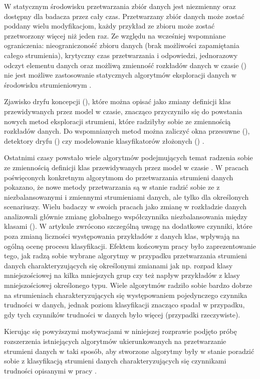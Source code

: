 W statycznym środowisku przetwarzania zbiór danych jest niezmienny oraz dostępny dla badacza przez cały czas. Przetwarzany zbiór danych może zostać poddany wielu modyfikacjom, każdy przykład ze zbioru może zostać przetworzony więcej niż jeden raz. Ze względu na wcześniej wspomniane ograniczenia: nieograniczoność zbioru danych (brak możliwości zapamiętania całego strumienia), krytyczny czas przetwarzania i odpowiedzi, jednorazowy odczyt elementu danych oraz możliwą zmienność rozkładów danych w czasie () nie jest możliwe zastosowanie statycznych algorytmów eksploracji danych w środowisku strumieniowym \cite{Article:TradDataStream}\cite{Prezentacja:Strumienie}.

Zjawisko dryfu koncepcji (), które można opisać jako zmiany definicji klas przewidywanych przez model w czasie, znacząco przyczyniło się do powstania nowych metod eksploracji strumieni, które radziłyby sobie ze zmiennością rozkładów danych. Do wspomnianych metod można zaliczyć okna przesuwne (), detektory dryfu () czy modelowanie klasyfikatorów złożonych () \cite{DBrzezinski}.

Ostatnimi czasy powstało wiele algorytmów podejmujących temat radzenia sobie ze zmiennością definicji klas przewidywanych przez model w czasie \cite{BrzezPhd2015}\cite{Article:ManyAlgorithms}\cite{Article:OBFirst}\cite{Article:OBSecond}. W pracach poświęconych konkretnym algorytmom do przetwarzania strumieni danych pokazano, że nowe metody przetwarzania są w stanie radzić sobie ze z niezbalansowanymi i zmiennymi strumieniami danych, ale tylko dla określonych scenariuszy. Wielu badaczy w swoich pracach jako zmianę w rozkładzie danych analizowali głównie zmianę globalnego współczynnika niezbalansowania między klasami (). W artykule \cite{Article:TypyPrzykladow} zwrócono szczególną uwagę na dodatkowe czynniki, które poza zmianą liczności występowania przykładów z danych klas, wpływają na ogólną ocenę procesu klasyfikacji. Efektem końcowym pracy było zaprezentowanie tego, jak radzą sobie wybrane algorytmy w przypadku przetwarzania strumieni danych charakteryzujących się określonymi zmianami jak np. rozpad klasy mniejszościowej na kilka mniejszych grup czy też napływ przykładów z klasy mniejszościowej określonego typu. Wiele algorytmów radziło sobie bardzo dobrze na strumieniach charakteryzujących się występowaniem pojedynczego czynnika trudności w danych, jednak poziom klasyfikacji znacząco spadał w przypadku, gdy tych czynników trudności w danych było więcej (przypadki rzeczywiste).

Kierując się powyższymi motywacjami w niniejszej rozprawie podjęto próbę rozszerzenia istniejących algorytmów ukierunkowanych na przetwarzanie strumieni danych w taki sposób, aby stworzone algorytmy były w stanie poradzić sobie z klasyfikacją strumieni danych charakteryzujących się czynnikami trudności opisanymi w pracy \cite{Article:TypyPrzykladow}.